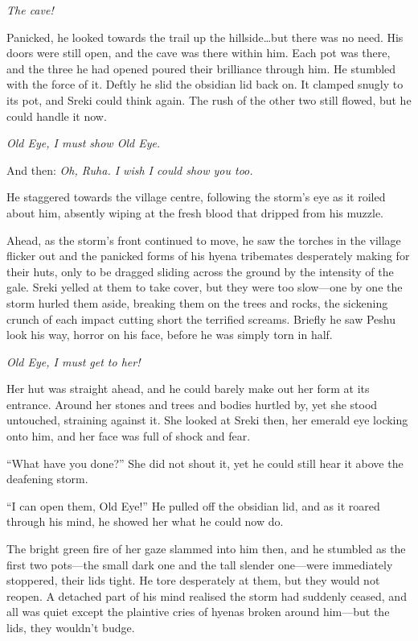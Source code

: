 \emph{The cave!}

Panicked, he looked towards the trail up the hillside\ldots{}but there was no need. His doors were still open, and the cave was there within him. Each pot was there, and the three he had opened poured their brilliance through him. He stumbled with the force of it. Deftly he slid the obsidian lid back on. It clamped snugly to its pot, and Sreki could think again. The rush of the other two still flowed, but he could handle it now.

\emph{Old Eye, I must show Old Eye.}

And then: \emph{Oh, Ruha. I wish I could show you too.}

He staggered towards the village centre, following the storm's eye as it roiled about him, absently wiping at the fresh blood that dripped from his muzzle.

Ahead, as the storm's front continued to move, he saw the torches in the village flicker out and the panicked forms of his hyena tribemates desperately making for their huts, only to be dragged sliding across the ground by the intensity of the gale. Sreki yelled at them to take cover, but they were too slow---one by one the storm hurled them aside, breaking them on the trees and rocks, the sickening crunch of each impact cutting short the terrified screams. Briefly he saw Peshu look his way, horror on his face, before he was simply torn in half.

\emph{Old Eye, I must get to her!}

Her hut was straight ahead, and he could barely make out her form at its entrance. Around her stones and trees and bodies hurtled by, yet she stood untouched, straining against it. She looked at Sreki then, her emerald eye locking onto him, and her face was full of shock and fear.

``What have you done?'' She did not shout it, yet he could still hear it above the deafening storm.

``I can open them, Old Eye!'' He pulled off the obsidian lid, and as it roared through his mind, he showed her what he could now do.

The bright green fire of her gaze slammed into him then, and he stumbled as the first two pots---the small dark one and the tall slender one---were immediately stoppered, their lids tight. He tore desperately at them, but they would not reopen. A detached part of his mind realised the storm had suddenly ceased, and all was quiet except the plaintive cries of hyenas broken around him---but the lids, they wouldn't budge.

